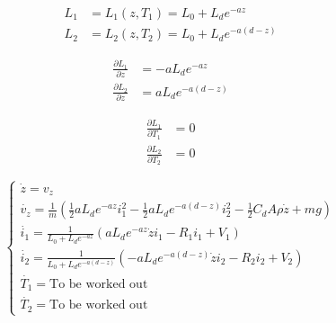 \begin{equation}
    \begin{aligned}
        L_1 & = L_1(z, T_1) = L_0 + L_d e^{-az}       \\
        L_2 & = L_2(z, T_2) = L_0 + L_d e^{-a(d - z)}
    \end{aligned}
\end{equation}

\begin{equation}
    \begin{aligned}
        \frac{\partial L_1}{\partial z} & = -a L_d e^{-az}      \\
        \frac{\partial L_2}{\partial z} & = a L_d e^{-a(d - z)}
    \end{aligned}
\end{equation}

\begin{equation}
    \begin{aligned}
        \frac{\partial L_1}{\partial T_1} & = 0 \\
        \frac{\partial L_2}{\partial T_2} & = 0
    \end{aligned}
\end{equation}

\begin{equation}
    \begin{cases}
        \dot{z} = v_z                                                                                                                                         \\
        \dot{v_z} = \frac{1}{m} \left( \frac{1}{2} a L_d e^{-az} i_1^2 - \frac{1}{2} a L_d e^{-a(d - z)} i_2^2 - \frac{1}{2} C_d A \rho \dot{z} + m g \right) \\
        \dot{i_1} = \frac{1}{L_0 + L_d e^{-az}} \left( a L_d e^{-az} \dot{z} i_1 - R_1 i_1 + V_1 \right)                                                      \\
        \dot{i_2} = \frac{1}{L_0 + L_d e^{-a(d - z)}} \left( -a L_d e^{-a(d - z)} \dot{z} i_2 - R_2 i_2 + V_2 \right)                                         \\
        \dot{T_1} = \text{To be worked out}                                                                                                                   \\
        \dot{T_2} = \text{To be worked out}
    \end{cases}
\end{equation}

